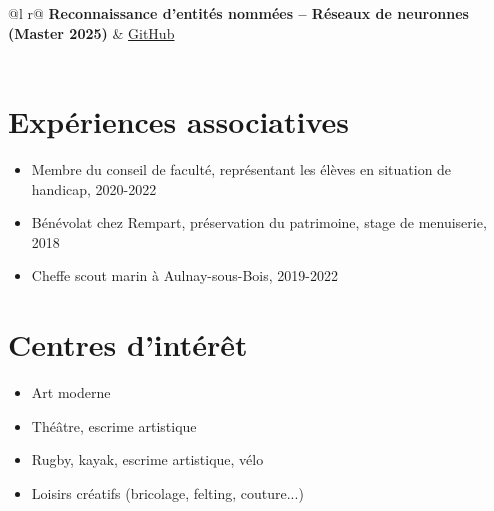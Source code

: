 \documentclass[a4paper,12pt]{article}
\begin{document}
\begin{tabularx}{\linewidth}{ @{}l r@{} }
\textbf{Reconnaissance d'entités nommées -- Réseaux de neuronnes (Master 2025)}
& \hfill \href{https://github.com/KehinaleK/NER-for-Elvish-Quenya}{GitHub} \\[3.75pt]
 \\
\end{tabularx}


\begin{minipage}[t]{0.49\linewidth}
\section*{Expériences associatives}
\begin{itemize}[leftmargin=*, nosep, itemsep=3pt]
    \item Membre du conseil de faculté, représentant les élèves en situation de handicap, 2020-2022
    \item Bénévolat chez Rempart, préservation du patrimoine, stage de menuiserie, 2018
    \item Cheffe scout marin à Aulnay-sous-Bois, 2019-2022
\end{itemize}
\end{minipage}\hfill
\begin{minipage}[t]{0.49\linewidth}
\section*{Centres d'intérêt}
\begin{itemize}[leftmargin=*, nosep, itemsep=3pt]
    \item Art moderne
    \item Théâtre, escrime artistique
    \item Rugby, kayak, escrime artistique, vélo
    \item Loisirs créatifs (bricolage, felting, couture...)
\end{itemize}
\end{minipage}


\vfill
\end{document}
